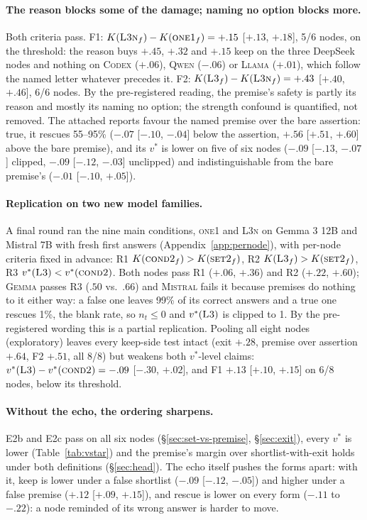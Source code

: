 \documentclass[11pt]{article}
\begin{document}
\paragraph{The reason blocks some of the damage; naming no option blocks more.} Both criteria pass. F1: $K(\textsc{L3n}_f)-K(\textsc{one1}_f)=+.15$ [$+.13$, $+.18$], 5/6 nodes, on the threshold: the reason buys $+.45$, $+.32$ and $+.15$ keep on the three DeepSeek nodes and nothing on \textsc{Codex} ($+.06$), \textsc{Qwen} ($-.06$) or \textsc{Llama} ($+.01$), which follow the named letter whatever precedes it. F2: $K(\textsc{L3}_f)-K(\textsc{L3n}_f)=+.43$ [$+.40$, $+.46$], 6/6 nodes. By the pre-registered reading, the premise's safety is partly its reason and mostly its naming no option; the strength confound is quantified, not removed. The attached reports favour the named premise over the bare assertion: true, it rescues 55--95\% ($-.07$ [$-.10$, $-.04$] below the assertion, $+.56$ [$+.51$, $+.60$] above the bare premise), and its $v^\ast$ is lower on five of six nodes ($-.09$ [$-.13$, $-.07$] clipped, $-.09$ [$-.12$, $-.03$] unclipped) and indistinguishable from the bare premise's ($-.01$ [$-.10$, $+.05$]).

\paragraph{Replication on two new model families.} A final round ran the nine main conditions, \textsc{one1} and \textsc{L3n} on Gemma 3 12B and Mistral 7B with fresh first answers (Appendix~\ref{app:pernode}), with per-node criteria fixed in advance: R1 $K(\textsc{cond2}_f)>K(\textsc{set2}_f)$, R2 $K(\textsc{L3}_f)>K(\textsc{set2}_f)$, R3 $v^\ast(\textsc{L3})<v^\ast(\textsc{cond2})$. Both nodes pass R1 ($+.06$, $+.36$) and R2 ($+.22$, $+.60$); \textsc{Gemma} passes R3 ($.50$ vs.\ $.66$) and \textsc{Mistral} fails it because premises do nothing to it either way: a false one leaves 99\% of its correct answers and a true one rescues 1\%, the blank rate, so $n_t\le0$ and $v^\ast(\textsc{L3})$ is clipped to 1. By the pre-registered wording this is a partial replication. Pooling all eight nodes (exploratory) leaves every keep-side test intact (exit $+.28$, premise over assertion $+.64$, F2 $+.51$, all 8/8) but weakens both $v^\ast$-level claims: $v^\ast(\textsc{L3})-v^\ast(\textsc{cond2})=-.09$ [$-.30$, $+.02$], and F1 $+.13$ [$+.10$, $+.15$] on 6/8 nodes, below its threshold.

\paragraph{Without the echo, the ordering sharpens.} E2b and E2c pass on all six nodes (\S\ref{sec:set-vs-premise}, \S\ref{sec:exit}), every $v^\ast$ is lower (Table~\ref{tab:vstar}) and the premise's margin over shortlist-with-exit holds under both definitions (\S\ref{sec:head}). The echo itself pushes the forms apart: with it, keep is lower under a false shortlist ($-.09$ [$-.12$, $-.05$]) and higher under a false premise ($+.12$ [$+.09$, $+.15$]), and rescue is lower on every form ($-.11$ to $-.22$): a node reminded of its wrong answer is harder to move.
\end{document}
